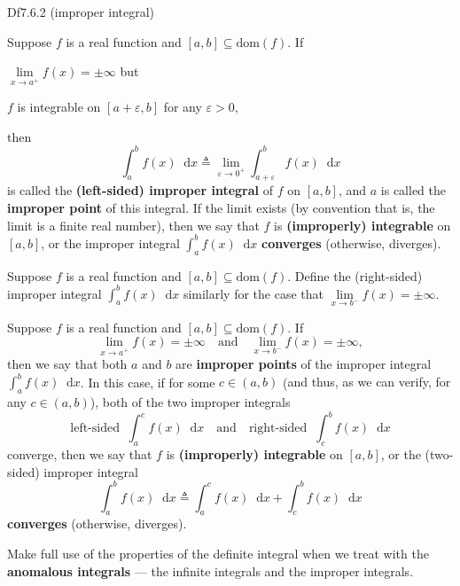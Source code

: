 \documentclass{article}
\newcommand{\dif}{\mathop{}\!\mathrm{d}}
\begin{document}
\begin{Df}{Df7.6.2 (improper integral)}
    \begin{compactenum}
        \item Suppose $f$ is a real function and $[a, b]\subseteq\text{dom}(f)$. If 
        \begin{compactenum}
            \item $\lim\limits_{x\to a^+}f(x) = \pm\infty$ but
            \item $f$ is integrable on $[a+\varepsilon, b]$ for any $\varepsilon>0$,
        \end{compactenum}
        then 
        $$\int_a^b f(x)\dif x \triangleq \lim_{\varepsilon\to 0^+}\int_{a+\varepsilon}^b f(x)\dif x$$
        is called the \textbf{(left-sided) improper integral} of $f$ on $[a, b]$, and $a$ is called the \textbf{improper point} of this integral. If the limit exists (by convention that is, the limit is a finite real number), then we say that $f$ is \textbf{(improperly) integrable} on $[a, b]$, or the improper integral $\int_a^b f(x)\dif x$ \textbf{converges} (otherwise, diverges).
        \item Suppose $f$ is a real function and $[a, b]\subseteq\text{dom}(f)$. Define the (right-sided) improper integral $\int_a^b f(x)\dif x$ similarly for the case that $\lim\limits_{x\to b^-}f(x) = \pm\infty$.
        \item Suppose $f$ is a real function and $[a, b]\subseteq\text{dom}(f)$. If 
        $$ \lim_{x\to a^+}f(x) = \pm\infty \quad \text{and} \quad \lim_{x\to b^-}f(x) = \pm\infty, $$
        then we say that both $a$ and $b$ are \textbf{improper points} of the improper integral $\int_a^b f(x)\dif x$. In this case, if for some $c\in(a, b)$ (\textcolor{Th}{and thus, as we can verify, for any $c\in(a, b)$}), both of the two improper integrals
        $$ \text{left-sided}\;\; \int_a^c f(x)\dif x \quad \text{and} \quad \text{right-sided}\;\; \int_c^b f(x)\dif x $$ 
        converge, then we say that $f$ is \textbf{(improperly) integrable} on $[a, b]$, or the (two-sided) improper integral
        $$\int_a^b f(x)\dif x \triangleq \int_a^c f(x)\dif x + \int_c^b f(x)\dif x$$
        \textbf{converges} (otherwise, diverges).
    \end{compactenum}
\end{Df}

\begin{Rmk}{}
    Make full use of the properties of the definite integral when we treat with the \textcolor{Df}{\textbf{anomalous integrals} — the infinite integrals and the improper integrals}.
\end{Rmk}
\end{document}
